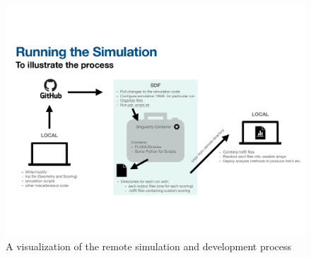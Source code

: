 \documentclass[10pt]{article}
\begin{document}
\clearpage
\appendixheaderon
\appendixpage
\begin{figure}[h]
    \begin{center}
    \includegraphics[scale=0.5]{figures/sim_diagram.pdf}
    \caption{A visualization of the remote simulation and development process}
    \label{fig:process1}
    \end{center}
\end{figure}
\end{document}
